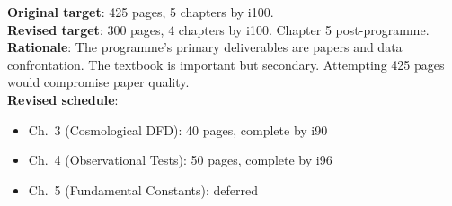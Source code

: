 \documentclass[11pt,a4paper]{article}
\begin{document}
\begin{tcolorbox}[colback=blue!5!white, colframe=dfdyellow, title=\textbf{Revised Textbook Plan}]
\textbf{Original target}: 425 pages, 5 chapters by i100.\\
\textbf{Revised target}: 300 pages, 4 chapters by i100. Chapter 5 post-programme.\\[6pt]
\textbf{Rationale}: The programme's primary deliverables are papers and data confrontation. The textbook is important but secondary. Attempting 425 pages would compromise paper quality.\\[6pt]
\textbf{Revised schedule}:
\begin{itemize}[nosep]
\item Ch.\ 3 (Cosmological DFD): 40 pages, complete by i90
\item Ch.\ 4 (Observational Tests): 50 pages, complete by i96
\item Ch.\ 5 (Fundamental Constants): deferred
\end{itemize}
\end{tcolorbox}
\end{document}
